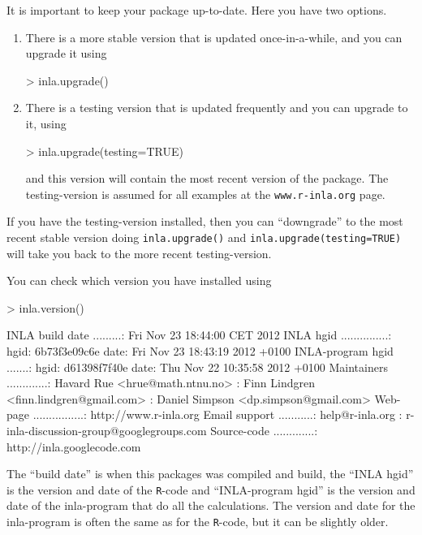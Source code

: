 \documentclass[a4paper,11pt]{report}
\newcommand{\tv}{\texttt}
\begin{document}
It is important to keep your package up-to-date. Here you have two
options. 
\begin{enumerate}
\item There is a more stable version that is updated once-in-a-while,
    and you can upgrade it using
\begin{Schunk}
\begin{Sinput}
> inla.upgrade()
\end{Sinput}
\end{Schunk}
\item There is a testing version that is updated frequently and you
    can upgrade to it, using
\begin{Schunk}
\begin{Sinput}
> inla.upgrade(testing=TRUE)
\end{Sinput}
\end{Schunk}
and this version will contain the most recent version of the package.
The testing-version is assumed for all examples at the
\verb|www.r-inla.org| page.
\end{enumerate}
If you have the testing-version installed, then you can ``downgrade''
to the most recent stable version doing \verb|inla.upgrade()| and
\verb|inla.upgrade(testing=TRUE)| will take you back to the more
recent testing-version. 

You can check which version you have installed using
\begin{Schunk}
\begin{Sinput}
> inla.version()
\end{Sinput}
\begin{Soutput}
	INLA build date .........: Fri Nov 23 18:44:00 CET 2012
	INLA hgid ...............: hgid: 6b73f3e09c6e  date: Fri Nov 23 18:43:19 2012 +0100
	INLA-program hgid .......: hgid: d61398f7f40e  date: Thu Nov 22 10:35:58 2012 +0100
	Maintainers .............: Havard Rue <hrue@math.ntnu.no>
	                         : Finn Lindgren <finn.lindgren@gmail.com>
	                         : Daniel Simpson <dp.simpson@gmail.com>
	Web-page ................: http://www.r-inla.org
	Email support ...........: help@r-inla.org
	                         : r-inla-discussion-group@googlegroups.com
	Source-code .............: http://inla.googlecode.com
\end{Soutput}
\end{Schunk}
The ``build date'' is when this packages was compiled and build, the
``INLA hgid'' is the version and date of the \tv{R}-code and 
``INLA-program hgid'' is the version and date of the inla-program that
do all the calculations. The version and date for the inla-program is
often the same as for the \tv{R}-code, but it can be slightly older. 
\end{document}
